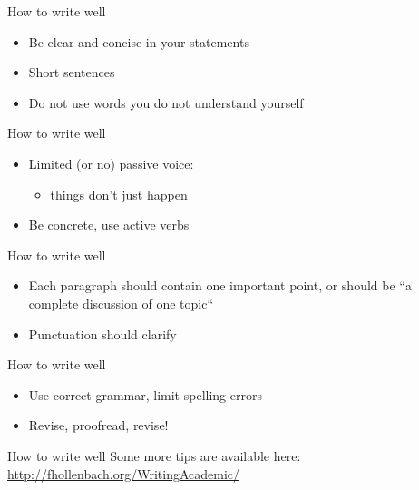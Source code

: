 \documentclass[presentation]{beamer}
\begin{document}
\begin{frame}[label={sec:org75b87c5}]{How to write well}
\begin{itemize}
\item Be clear and concise in your statements
\item Short sentences
\item Do \alert{not} use words you do not understand yourself
\end{itemize}
\end{frame}


\begin{frame}[label={sec:org5077995}]{How to write well}
\begin{itemize}
\item Limited (or no) passive voice:
\begin{itemize}
\item things don't just happen
\end{itemize}
\item Be concrete, use active verbs
\end{itemize}
\end{frame}


\begin{frame}[label={sec:org4268491}]{How to write well}
\begin{itemize}
\item Each paragraph should contain one important point, or should be “a complete discussion of one topic``
\item Punctuation should clarify
\end{itemize}
\end{frame}

\begin{frame}[label={sec:orgaa8c079}]{How to write well}
\begin{itemize}
\item Use correct grammar, limit spelling errors
\item Revise, proofread, revise!
\end{itemize}
\end{frame}


\begin{frame}[label={sec:org668ae22}]{How to write well}
Some more tips are available here:
\href{http://fhollenbach.org/WritingAcademic/}{http://fhollenbach.org/WritingAcademic/}
\end{frame}
\end{document}

